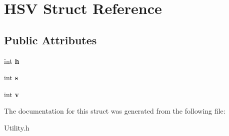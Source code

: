 \hypertarget{struct_h_s_v}{\section{H\-S\-V Struct Reference}
\label{struct_h_s_v}
}
\subsection*{Public Attributes}
\begin{DoxyCompactItemize}
\item 
\hypertarget{struct_h_s_v_ab038be2f08af85438d55554c5580d79c}{int {\bfseries h}}\label{struct_h_s_v_ab038be2f08af85438d55554c5580d79c}

\item 
\hypertarget{struct_h_s_v_a9bb3f6690e6879d417c4488b81cf90ca}{int {\bfseries s}}\label{struct_h_s_v_a9bb3f6690e6879d417c4488b81cf90ca}

\item 
\hypertarget{struct_h_s_v_acf84a724f9e1478f30f1238ca487ad69}{int {\bfseries v}}\label{struct_h_s_v_acf84a724f9e1478f30f1238ca487ad69}

\end{DoxyCompactItemize}


The documentation for this struct was generated from the following file\-:\begin{DoxyCompactItemize}
\item 
Utility.\-h\end{DoxyCompactItemize}
